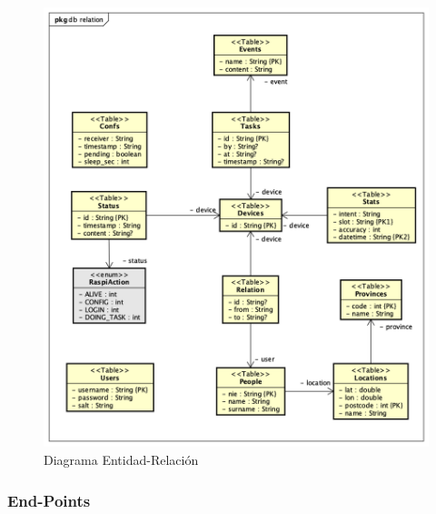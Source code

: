\begin{figure}[H]
    \centering
    \includegraphics[width=14cm]{./img/arch/back/d.er.png}
    \caption{Diagrama Entidad-Relación}
    \label{fig:d.er}
\end{figure}

    \subsubsection{End-Points}
    